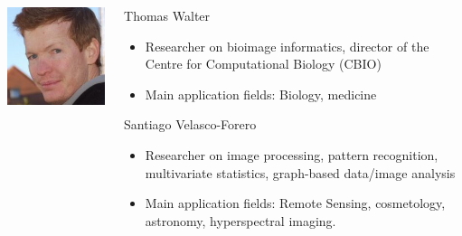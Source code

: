 \documentclass[xcolor=pdftex,dvipsnames,table,mathserif]{beamer}
\begin{document}
{\begin{columns}
\begin{column}{.2\textwidth}
\vspace{2em}
    \includegraphics[width=\textwidth]{ed.jpg}

  \end{column}
  \begin{column}{.8\textwidth}

    \begin{block}{Thomas Walter}
      \scriptsize{
    \begin{itemize}
    \item Researcher on bioimage informatics, director of the Centre for Computational Biology (CBIO)
    \item Main application fields: Biology, medicine
    \end{itemize}
    }
  \end{block}

  \begin{block}{Santiago Velasco-Forero}
      \scriptsize{
    \begin{itemize}
    \item Researcher on image processing, pattern recognition, multivariate statistics, graph-based data/image analysis
    \item Main application fields: Remote Sensing, cosmetology, astronomy, hyperspectral imaging.
    \end{itemize}
    }
  \end{block}


\end{column}
\end{columns}}
\end{document}
